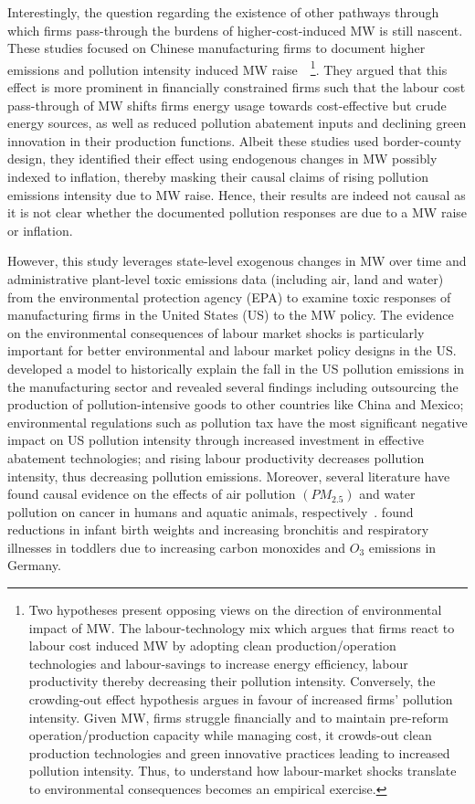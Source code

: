 \documentclass[12pt, english]{article}
\begin{document}
    Interestingly, the question regarding the existence of other pathways through which firms pass-through the burdens of higher-cost-induced MW is still nascent. These studies focused on Chinese manufacturing firms to document higher emissions and pollution intensity induced MW raise~\parencite{li2023does, zhang2023unintended}~\footnote{\tiny Two hypotheses present opposing views on the direction of environmental impact of MW. The labour-technology mix which argues that firms react to labour cost induced MW by adopting clean production/operation technologies and labour-savings to increase energy efficiency, labour productivity thereby decreasing their pollution intensity. Conversely, the crowding-out effect hypothesis argues in favour of increased firms' pollution intensity. Given MW, firms struggle financially and to maintain pre-reform operation/production capacity while managing cost, it crowds-out clean production technologies and green innovative practices leading to increased pollution intensity. Thus, to understand how labour-market shocks translate to environmental consequences becomes an empirical exercise.}. They argued that this effect is more prominent in financially constrained firms such that the labour cost pass-through of MW shifts firms energy usage towards cost-effective but crude energy sources, as well as reduced pollution abatement inputs and declining green innovation in their production functions. Albeit these studies used border-county design, they identified their effect using endogenous changes in MW possibly indexed to inflation, thereby masking their causal claims of rising pollution emissions intensity due to MW raise. Hence, their results are indeed not causal as it is not clear whether the documented pollution responses are due to a MW raise or inflation.

    However, this study leverages state-level exogenous changes in MW over time and administrative plant-level toxic emissions data (including air, land and water) from the environmental protection agency (EPA) to examine toxic responses of manufacturing firms in the United States (US) to the MW policy. The evidence on the environmental consequences of labour market shocks is particularly important for better environmental and labour market policy designs in the US.~\cite{shapiro2018pollution} developed a model to historically explain the fall in the US pollution emissions in the manufacturing sector and revealed several findings including outsourcing the production of pollution-intensive goods to other countries like China and Mexico; environmental regulations such as pollution tax have the most significant negative impact on US pollution intensity through increased investment in effective abatement technologies; and rising labour productivity decreases pollution intensity, thus decreasing pollution emissions. Moreover, several literature have found causal evidence on the effects of air pollution $(PM_{2.5})$ and water pollution on cancer in humans and aquatic animals, respectively~\parencite{turner2020outdoor, turner2017ambient, baines2021linking}. \cite{coneus2012pollution} found reductions in infant birth weights and increasing bronchitis and respiratory illnesses in toddlers due to increasing carbon monoxides and $O_{3}$ emissions in Germany.
\end{document}

